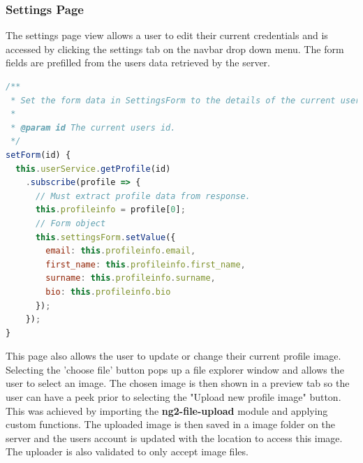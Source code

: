 \subsubsection{Settings Page}
The settings page view allows a user to edit their current credentials and is accessed by clicking the settings tab on the navbar drop down menu. The form fields are prefilled from the users data retrieved by the server.

\begin{lstlisting}[language=JavaScript,caption={Defining User Schema},captionpos=b,label={fig:userscema}]
/**
 * Set the form data in SettingsForm to the details of the current user.
 * 
 * @param id The current users id.
 */
setForm(id) {
  this.userService.getProfile(id)
    .subscribe(profile => {
      // Must extract profile data from response.
      this.profileinfo = profile[0];
      // Form object
      this.settingsForm.setValue({
        email: this.profileinfo.email,
        first_name: this.profileinfo.first_name,
        surname: this.profileinfo.surname,
        bio: this.profileinfo.bio
      });
    });
}
\end{lstlisting}
 This page also allows the user to update or change their current profile image. Selecting the 'choose file' button pops up a file explorer window and allows the user to select an image. The chosen image is then shown in a preview tab so the user can have a peek prior to selecting the "Upload new profile image" button. This was achieved by importing the \textbf{ng2-file-upload} module and applying custom functions. The uploaded image is then saved in a image folder on the server and the users account is updated with the location to access this image. The uploader is also validated to only accept image files.

